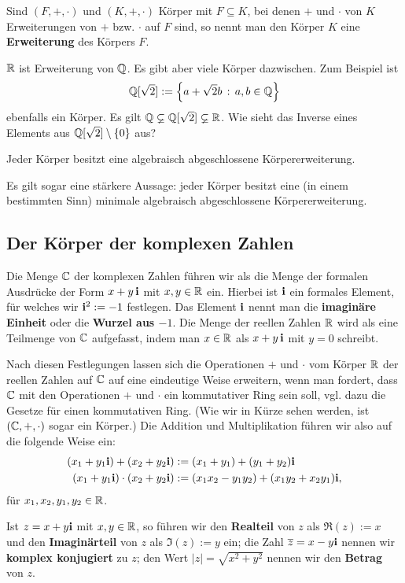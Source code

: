 \begin{defn}
	Sind $(F,+,\cdot)$ und $(K,+,\cdot)$ Körper mit $F \subseteq K$, bei denen $+$ und $\cdot$ von $K$ Erweiterungen von $+$ bzw. $\cdot$ auf $F$ sind, so nennt man den Körper $K$ eine \textbf{Erweiterung} des Körpers $F$. 
\end{defn} 

\begin{bsp}
	$\mathbb{R}$ ist Erweiterung von $\mathbb{Q}$. Es gibt aber viele Körper dazwischen. Zum Beispiel ist 
	\[
		\mathbb{Q}[\sqrt{2}] := \left\{  a + \sqrt{2} b  \,:\, a,b \in \mathbb{Q} \right\}
	\]
	ebenfalls ein Körper. Es gilt $\mathbb{Q} \varsubsetneq \mathbb{Q}[\sqrt{2}] \varsubsetneq \mathbb{R}$. 
	Wie sieht das Inverse eines Elements aus $\mathbb{Q}[\sqrt{2} ] \setminus \{0\}$ aus? 
\end{bsp} 

\begin{thm}
	Jeder Körper besitzt eine algebraisch abgeschlossene Körpererwei\-terung. 	
\end{thm} 

\begin{bem}
	Es gilt sogar eine stärkere Aussage: jeder Körper besitzt eine (in einem bestimmten Sinn) minimale algebraisch abgeschlossene Körpererweiterung. 
\end{bem} 

\subsection{Der Körper der komplexen Zahlen} 

\begin{defn} 
	Die Menge $\mathbb{C}$ der komplexen Zahlen führen wir als die Menge der formalen Ausdrücke der Form $x +  y \, \mathbf{i}$ mit $x, y \in \mathbb{R}$ ein. Hierbei ist $\mathbf{i}$ ein formales Element, für welches wir $\mathbf{i}^2 := -1$ festlegen. Das Element $\mathbf{i}$ nennt man die \textbf{imaginäre Einheit} oder die \textbf{Wurzel aus $-1$}. Die Menge der reellen Zahlen $\mathbb{R}$ wird als eine Teilmenge von $\mathbb{C}$ aufgefasst, indem man $x \in \mathbb{R}$ als $x +  y  \, \mathbf{i}$ mit $y=0$ schreibt. 
	
	Nach diesen Festlegungen lassen sich die Operationen $+$ und $\cdot$ vom Körper $\mathbb{R}$ der reellen Zahlen auf $\mathbb{C}$ auf eine eindeutige Weise erweitern, wenn man fordert, dass  $\mathbb{C}$ mit den Operationen $+$ und $\cdot$ ein kommutativer Ring sein soll, vgl. dazu die Gesetze für einen kommutativen Ring.  (Wie wir in Kürze sehen werden, ist $(\mathbb{C},+,\cdot)$ sogar ein Körper.) Die Addition und Multiplikation führen wir also auf die folgende Weise ein:
	\begin{align*}
			(x_1 + y_1 \mathbf{i} ) + (x_2 +  y_2 \mathbf{i} ) & := (x_1 +y_1) +  (y_1 + y_2) \mathbf{i}
			\\ (x_1 + y_1 \mathbf{i}) \cdot (x_2 + y_2 \mathbf{i}) & := (x_1 x_2 - y_1 y_2) + (x_1 y_2 + x_2 y_1) \mathbf{i},
	\end{align*} 
für $x_1,x_2, y_1, y_2 \in \mathbb{R}$. 

Ist $z = x  + y \mathbf{i}$ mit $x, y \in \mathbb{R}$, so führen wir den \textbf{Realteil} von $z$ als $\Re(z) :=x$ und den \textbf{Imaginärteil} von $z$ als $\Im(z):= y$ ein; die Zahl $\overline{z} = x - y \mathbf{i}$ nennen wir \textbf{komplex konjugiert} zu $z$; den Wert $|z| = \sqrt{x^2 + y^2}$ nennen wir den \textbf{Betrag} von $z$. 
\end{defn} 

